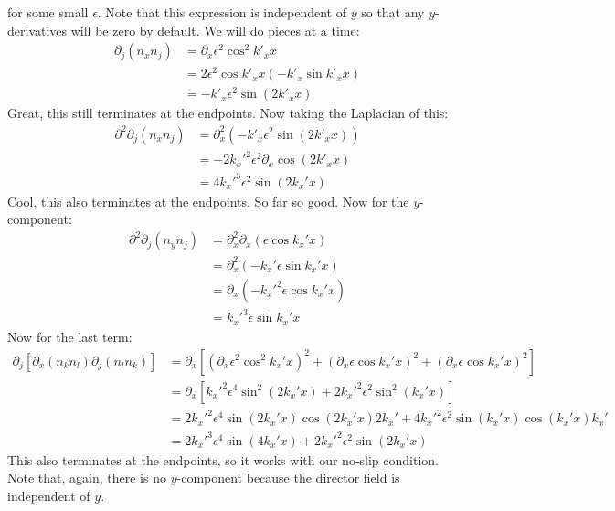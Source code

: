 \documentclass[reqno]{article}
\begin{document}
	for some small $\epsilon$. 
	Note that this expression is independent of $y$ so that any $y$-derivatives will be zero by default.
	We will do pieces at a time:
	\begin{equation}
	\begin{split}
	\partial_j \left( n_x n_j \right)
	&= \partial_x \epsilon^2 \cos^2 k'_x x \\
	&= 2 \epsilon^2 \cos k'_x x \left( -k'_x \sin k'_x x \right) \\
	&= -k'_x \epsilon^2 \sin \left( 2 k'_x x \right)
	\end{split}
	\end{equation}
	Great, this still terminates at the endpoints.
	Now taking the Laplacian of this:
	\begin{equation}
	\begin{split}
	\partial^2 \partial_j \left( n_x n_j \right)
	&= \partial_x^2 \left( -k'_x \epsilon^2 \sin \left( 2 k'_x x \right) \right) \\
	&= - 2 k_x'^2 \epsilon^2 \partial_x \cos \left( 2 k'_x x \right) \\
	&= 4 k_x'^3 \epsilon^2 \sin \left( 2 k_x' x \right)
	\end{split}
	\end{equation}
	Cool, this also terminates at the endpoints. 
	So far so good.
	Now for the $y$-component:
	\begin{equation}
	\begin{split}
	\partial^2 \partial_j \left( n_y n_j \right)
	&= \partial_x^2 \partial_x \left( \epsilon \cos k_x' x \right) \\
	&= \partial_x^2 \left( - k_x' \epsilon \sin k_x' x \right) \\
	&= \partial_x \left( - k_x'^2 \epsilon \cos k_x' x \right) \\
	&= k_x'^3 \epsilon \sin k_x' x
	\end{split}
	\end{equation}
	Now for the last term:
	\begin{equation}
	\begin{split}
	\partial_j \left[ 
	\partial_x \left( n_k n_l \right) 
	\partial_j \left( n_l n_k \right) 
	\right] 
	&= \partial_x
	\left[
	\left( \partial_x \epsilon^2 \cos^2 k_x' x \right)^2
	+ \left( \partial_x \epsilon \cos k_x' x \right)^2
	+ \left( \partial_x \epsilon \cos k_x' x \right)^2
	\right] \\
	&= \partial_x
	\left[
	k_x'^2 \epsilon^4 \sin^2 \left( 2 k_x' x \right)
	+ 2 k_x'^2 \epsilon^2 \sin^2 \left( k_x' x \right) 
	\right] \\
	&= 2 k_x'^2 \epsilon^4 \sin \left( 2 k_x' x \right)
	\cos \left( 2 k_x' x \right) 2 k_x'
	+ 4 k_x'^2 \epsilon^2 \sin \left( k_x' x \right)
	\cos \left( k_x' x \right) k_x' \\
	&= 2 k_x'^3 \epsilon^4 \sin \left( 4 k_x' x \right)
	+ 2 k_x'^2 \epsilon^2 \sin \left( 2 k_x' x \right)
	\end{split}
	\end{equation}
	This also terminates at the endpoints, so it works with our no-slip condition. Note that, again, there is no $y$-component because the director field is independent of $y$. 
	
\end{document}
